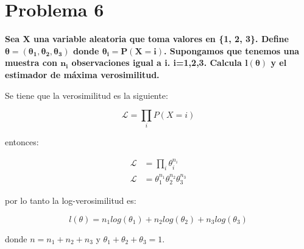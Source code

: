 \section*{Problema 6}

\textbf{Sea X una variable aleatoria que toma valores en \{1, 2, 3\}. Define $\mathbf{\theta = (\theta_1, \theta_2, \theta_3)}$ donde $\mathbf{\theta_i = P(X=i)}$. Supongamos que tenemos una muestra con $\mathbf{n_i}$ observaciones igual a i. i=1,2,3. Calcula $\mathbf{l(\theta)}$ y el estimador de máxima verosimilitud.}

Se tiene que la verosimilitud es la siguiente:

\begin{equation*}
    \mathcal{L} = \prod_i P(X=i)
\end{equation*}

entonces:

\begin{align*}
    \mathcal{L} & = \prod_i \theta_i^{n_i}                     \\
    \mathcal{L} & = \theta_1^{n_1}\theta_2^{n_2}\theta_3^{n_3}
\end{align*}

por lo tanto la log-verosimilitud es:

\begin{equation*}
    l(\theta)= n_1 log(\theta_1) + n_2 log(\theta_2)+n_3 log(\theta_3)
\end{equation*}

donde $n=n_1+n_2+n_3$ y $\theta_1+\theta_2+\theta_3=1$.
